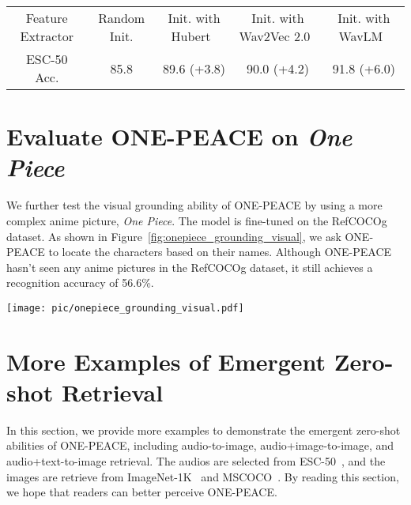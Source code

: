 \documentclass{article}
\newcommand{\onepeace}{ONE-PEACE\xspace}
\newcommand{\normaltablestyle}[2]{\setlength{\tabcolsep}{#1}\renewcommand{\arraystretch}{#2}\centering\normalsize}
\begin{document}
 \begin{table*}[h]
\centering
\normaltablestyle{6pt}{1.3}
\begin{tabular}{c|cccc}
  Feature Extractor & Random Init. & Init. with Hubert~\cite{hubert} & Init. with Wav2Vec 2.0~\cite{wav2vec2} & Init. with WavLM~\cite{wavlm}
  \\
  \shline
  ESC-50 Acc. & 85.8 &89.6 (+3.8)  & 90.0 (+4.2) & 91.8 (+6.0)
  \\
\end{tabular}
\caption{\textbf{Ablation studies of pretrained audio feature extractors.} We report zero-shot accuracy on the ESC-50 dataset.}
\label{tb:audio_ablation}
\end{table*}


\section{Evaluate \onepeace on \textit{One Piece}}
\label{app:one_piece}
We further test the visual grounding ability of \onepeace by using a more complex anime picture, \textit{One Piece}. 
The model is fine-tuned on the RefCOCOg dataset.
As shown in Figure~\ref{fig:onepiece_grounding_visual}, we ask \onepeace to locate the characters based on their names. Although \onepeace hasn't seen any anime pictures in the RefCOCOg dataset, it still achieves a recognition accuracy of 56.6\%.

\label{app:visual_grounding_onepiece}
\begin{figure*}[t]
    \centering
    \texttt{[image: pic/onepiece\_grounding\_visual.pdf]}
    \caption{Visualization of \onepeace locating different characters of \textit{One Piece}. Given the names of 9 members of the Straw Hat Pirates, \onepeace correctly located 5 of them from the picture.}
    \label{fig:onepiece_grounding_visual}
\end{figure*}

\section{More Examples of Emergent Zero-shot Retrieval}
\label{app:emergent_zero_shot}

In this section, we provide more examples to demonstrate the emergent zero-shot abilities of \onepeace, including audio-to-image, audio+image-to-image, and audio+text-to-image retrieval.
The audios are selected from ESC-50~\cite{esc50}, and the images are retrieve from ImageNet-1K~\cite{imagenet} and MSCOCO~\cite{mscoco}.
By reading this section, we hope that readers can better perceive \onepeace.
\end{document}
